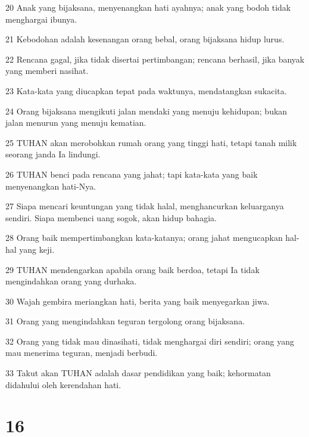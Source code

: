 \par 20 Anak yang bijaksana, menyenangkan hati ayahnya; anak yang bodoh tidak menghargai ibunya.
\par 21 Kebodohan adalah kesenangan orang bebal, orang bijaksana hidup lurus.
\par 22 Rencana gagal, jika tidak disertai pertimbangan; rencana berhasil, jika banyak yang memberi nasihat.
\par 23 Kata-kata yang diucapkan tepat pada waktunya, mendatangkan sukacita.
\par 24 Orang bijaksana mengikuti jalan mendaki yang menuju kehidupan; bukan jalan menurun yang menuju kematian.
\par 25 TUHAN akan merobohkan rumah orang yang tinggi hati, tetapi tanah milik seorang janda Ia lindungi.
\par 26 TUHAN benci pada rencana yang jahat; tapi kata-kata yang baik menyenangkan hati-Nya.
\par 27 Siapa mencari keuntungan yang tidak halal, menghancurkan keluarganya sendiri. Siapa membenci uang sogok, akan hidup bahagia.
\par 28 Orang baik mempertimbangkan kata-katanya; orang jahat mengucapkan hal-hal yang keji.
\par 29 TUHAN mendengarkan apabila orang baik berdoa, tetapi Ia tidak mengindahkan orang yang durhaka.
\par 30 Wajah gembira meriangkan hati, berita yang baik menyegarkan jiwa.
\par 31 Orang yang mengindahkan teguran tergolong orang bijaksana.
\par 32 Orang yang tidak mau dinasihati, tidak menghargai diri sendiri; orang yang mau menerima teguran, menjadi berbudi.
\par 33 Takut akan TUHAN adalah dasar pendidikan yang baik; kehormatan didahului oleh kerendahan hati.

\chapter{16}

